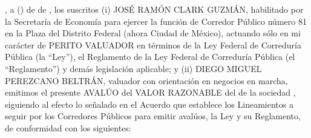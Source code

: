 \lugarInforme, a \diaInforme{} (\numberstringnum{\diainforme}) de \numberstringnum{\mesinforme}{} de \numberstringnum{\annoinforme}{}, los suscritos (i) JOSÉ RAMÓN CLARK GUZMÁN, habilitado por la Secretaría de Economía para ejercer la función de Corredor Público número 81 en la Plaza del Distrito Federal (ahora Ciudad de México), actuando sólo en mi carácter de PERITO VALUADOR en términos de la Ley Federal de Correduría Pública (la “Ley”), el Reglamento de la Ley Federal de Correduría Pública (el “Reglamento”) y demás legislación aplicable; y (ii) DIEGO MIGUEL PEREZCANO BELTRÁN, valuador con orientación en negocios en marcha, emitimos el presente AVALÚO del VALOR RAZONABLE del \tipoAvaluo{} de la sociedad \bienesValuados, siguiendo al efecto lo señalado en el Acuerdo que establece los Lineamientos a seguir por los Corredores Públicos para emitir avalúos, la Ley y su Reglamento, de conformidad con los siguientes:



